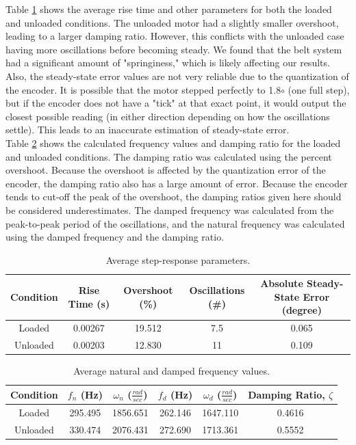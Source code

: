 \documentclass{article}
\theoremstyle{plain}
\theoremstyle{definition}
\theoremstyle{remark}
\begin{document}
Table \ref{q3ai_!} shows the average rise time and other parameters for both the loaded and unloaded conditions. The unloaded motor had a slightly smaller overshoot, leading to a larger damping ratio. However, this conflicts with the unloaded case having more oscillations before becoming steady. We found that the belt system had a significant amount of "springiness," which is likely affecting our results. Also, the steady-state error values are not very reliable due to the quantization of the encoder. It is possible that the motor stepped perfectly to 1.8$\circ$ (one full step), but if the encoder does not have a "tick" at that exact point, it would output the closest possible reading (in either direction depending on how the oscillations settle). This leads to an inaccurate estimation of steady-state error. \\


Table \ref{q3ai_@} shows the calculated frequency values and damping ratio for the loaded and unloaded conditions. The damping ratio was calculated using the percent overshoot. Because the overshoot is affected by the quantization error of the encoder, the damping ratio also has a large amount of error. Because the encoder tends to cut-off the peak of the overshoot, the damping ratios given here should be considered underestimates. The damped frequency was calculated from the peak-to-peak period of the oscillations, and the natural frequency was calculated using the damped frequency and the damping ratio.\\


\begin{table}[htb]
\begin{center}
    \begin{tabular}{|c|c|c|c|c|}
        \hline
        Condition & Rise Time (s)  & Overshoot (\%) & Oscillations (\#) &  Absolute Steady-State Error (degree)   \\ \hline
        Loaded   & 0.00267    & 19.512 & 7.5 &   0.065 \\ 
        Unloaded   & 0.00203    & 12.830 & 11 & 0.109         \\         
        \hline
    \end{tabular}
\caption{Average step-response parameters.}
\label{q3ai_!}
\end{center}
\end{table}

\begin{table}[htb]
\begin{center}
    \begin{tabular}{|c|c|c|c|c|c|}
        \hline
        Condition & $f _n$ (Hz)  & $\omega _n$ ($\frac{rad}{sec}$) & $f _d$ (Hz) &  $\omega _d$ ($\frac{rad}{sec}$) & Damping Ratio, $\zeta$   \\ \hline
        Loaded   & 295.495   & 1856.651 & 262.146 &  1647.110 & 0.4616\\ 
        Unloaded   & 330.474   & 2076.431 & 272.690 & 1713.361 & 0.5552         \\         
        \hline
    \end{tabular}
\caption{Average natural and damped frequency values.}
\label{q3ai_@}
\end{center}
\end{table}
\end{document}
